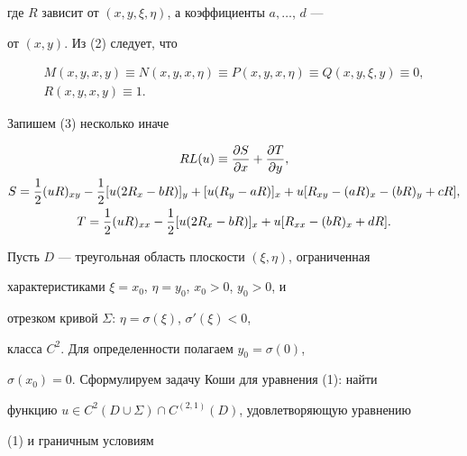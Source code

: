 где $R$ зависит от $(x,y,\xi,\eta)$, а коэффициенты $a,\dotsc$, $d$ ---


от $(x,y)$. Из (2) следует, что


\begin{equation}


\begin{array}{c}


M(x,y,x,y)\equiv N(x,y,x,\eta)\equiv P(x,y,x,\eta)\equiv


Q(x,y,\xi,y)\equiv 0,\\[2mm]


R(x,y,x,y)\equiv 1.


\end{array}


\end{equation}


Запишем (3) несколько иначе


\begin{gather}


RL(u)\equiv\frac{\partial S}{\partial x}+\frac{\partial T}{\partial y},\\


%


S=\frac{1}{2}(uR)_{xy}


-\frac{1}{2}[u(2R_{x}-bR)]_{y}+[u(R_{y}-aR)]_{x}+


u[R_{xy}-(aR)_{x}-(bR)_{y}+cR],\notag \\


%


T=\frac{1}{2}(uR)_{xx}-\frac{1}{2}[u(2R_{x}-bR)]_{x}


+u[R_{xx}-(bR)_{x}+dR].\notag


\end{gather}





Пусть $D$ --- треугольная область плоскости $(\xi,\eta)$, ограниченная


характеристиками $\xi=x_{0}$, $\eta=y_{0}$, $x_{0}>0$, $y_{0}>0$, и


отрезком кривой $\Sigma$: $\eta=\sigma(\xi)$, $\sigma'(\xi)<0$,


класса $C^{2}$. Для определенности полагаем $y_{0}=\sigma(0)$,


$\sigma(x_{0})=0$. Сформулируем задачу Коши для уравнения (1): найти


функцию $u\in C^{2}(D\cup\Sigma)\cap C^{(2,1)}(D)$, удовлетворяющую уравнению


(1) и граничным условиям


